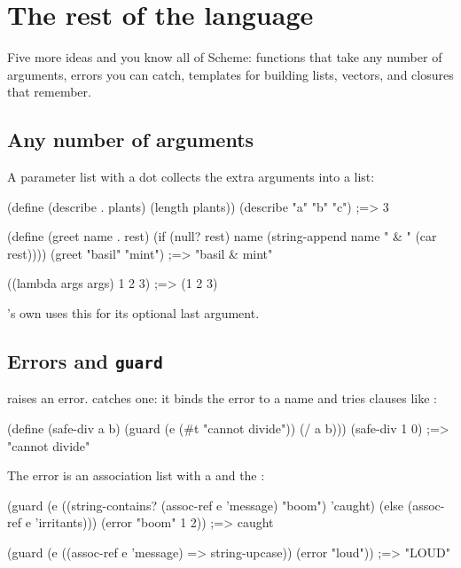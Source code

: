 \chapter{The rest of the language}
\label{ch:forms}

Five more ideas and you know all of \nodwyn{} Scheme: functions that take
any number of arguments, errors you can catch, templates for building lists,
vectors, and closures that remember.

\section{Any number of arguments}

A parameter list with a dot collects the extra arguments into a list:

\begin{scm}
(define (describe . plants) (length plants))
(describe "a" "b" "c")                        ;=> 3

(define (greet name . rest)
  (if (null? rest) name (string-append name " & " (car rest))))
(greet "basil" "mint")                        ;=> "basil & mint"

((lambda args args) 1 2 3)                    ;=> (1 2 3)
\end{scm}

\nodwyn's own  uses this for its
optional last argument.

\section{Errors and \texttt{guard}}

 raises an error.  catches
one: it binds the error to a name and tries clauses like :

\begin{scm}
(define (safe-div a b)
  (guard (e (#t "cannot divide"))
    (/ a b)))
(safe-div 1 0)                                ;=> "cannot divide"
\end{scm}

The error is an association list with a  and the
:

\begin{scm}
(guard (e ((string-contains? (assoc-ref e 'message) "boom") 'caught)
          (else (assoc-ref e 'irritants)))
  (error "boom" 1 2))                         ;=> caught

(guard (e ((assoc-ref e 'message) => string-upcase))
  (error "loud"))                             ;=> "LOUD"
\end{scm}

